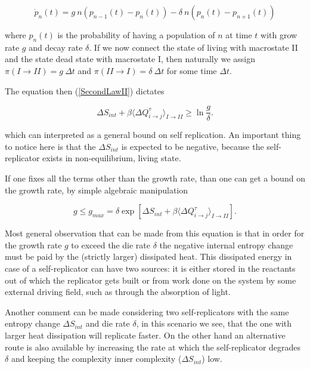 \documentclass[a4paper,12pt]{article}
\begin{document}
\begin{equation}
  \dot{p}_n(t)=g\ n\left(p_{n-1}(t)-p_n(t)\right)-\delta\ n\left(p_n(t)-p_{n+1}(t)\right)
\end{equation}

where $p_n(t)$ is the probability of having a population of $n$ at time $t$ with grow rate $g$ and decay rate $\delta $.
If we now connect the state of living with macrostate II and the state dead state with macrostate I, then naturally we assign $\pi (I \to II) = g\ \Delta t$ and $\pi (II \to I) = \delta\ \Delta t$ for some time $\Delta t$.

The equation then (\ref{SecondLawII}) dictates

\begin{equation}
  \Delta S_{int} + \beta \langle \Delta Q_{i\to j}^{\tau}  \rangle_{I \to II} \geq \ln{\frac{g}{\delta}}.
\end{equation}

which can interpreted as a general bound on self replication.
An important thing to notice here is that the $\Delta S_{int}$ is expected to be negative, because the self-replicator exists in non-equilibrium, living state.

If one fixes all the terms other than the growth rate, than one can get a bound on the growth rate, by simple algebraic manipulation

\begin{equation}
  g \leq g_{max}=\delta \exp[ \Delta S_{int} + \beta \langle \Delta Q_{i\to j}^{\tau}  \rangle_{I \to II}].
\end{equation}

Most general observation that can be made from this equation is that  in order for the growth rate $g$ to exceed the die rate $\delta $ the negative internal entropy change must be paid by the (strictly larger) dissipated heat. This dissipated energy in case of a self-replicator can have two sources: it is either stored in the reactants out of which the replicator gets built or from work done on the system by some external driving field, such as through the absorption of light.

Another comment can be made considering two self-replicators with the same entropy change $\Delta S_{int}$ and die rate $\delta$, in this scenario we see, that the one with larger heat dissipation will replicate faster.
On the other hand an alternative route is also available by increasing the rate at which the self-replicator degrades $\delta $ and keeping the complexity inner complexity ($\Delta S_{int}$) low.
\end{document}
